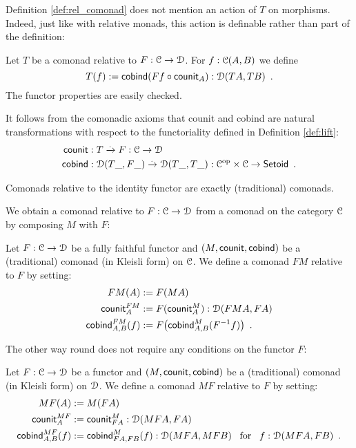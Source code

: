 \documentclass[a4paper,USenglish]{lipics}
\begin{document}
 Definition \ref{def:rel_comonad} does not mention an action of $T$ on morphisms. Indeed, just like with relative monads, this action is definable rather than part of the definition:
\begin{definition}%
\label{def:lift}
 Let $T$ be a  comonad relative to $F:\C\to\D$.
 For $f : \C(A,B)$ we define
  \[ T(f) := \cobind(\comp{\counit_A}{Ff}) : \D(TA,TB) \enspace .\] 
 The functor properties are easily checked.
\end{definition}

\begin{rem}
 It follows from the comonadic axioms that
 counit and cobind are natural transformations with respect to the functoriality defined in Definition \ref{def:lift}:
 \begin{align*}
     \counit &: T \xrightarrow{.} F : \C\to \D \\
     \cobind &: \D(T\_, F\_) \xrightarrow{.} \D(T\_, T\_) : \C^{\text{op}} \times \C \to \Setoid \enspace .
 \end{align*}

\end{rem}





Comonads relative to the identity functor are exactly (traditional) comonads.




We obtain a comonad relative to $F:\C\to\D$ from a comonad on the category $\C$ by composing $M$ with $F$:
\begin{example}\label{ex_relcom_from_com}
  Let $F : \C \to \D$ be a fully faithful functor and $(M,\counit,\cobind)$ be a (traditional) comonad (in Kleisli form) on $\C$.
  We define a comonad $FM$ relative to $F$ by setting:
   \begin{align*}
        FM(A) &:= F(MA) \\
        \counit^{FM}_A &:= F(\counit^M_A) : \D(FMA,FA) \\
        \cobind^{FM}_{A,B} (f) &:= F\bigl(\cobind^M_{A,B}(F^{-1}f)\bigr) \enspace .
    \end{align*}

\end{example}

\noindent
The other way round does not require any conditions on the functor $F$:
\begin{example}\label{ex_relcom_from_com_on_target}
    Let $F : \C \to \D$ be a functor and $(M,\counit,\cobind)$ be a (traditional) comonad (in Kleisli form) on $\D$.
  We define a comonad $MF$ relative to $F$ by setting:
  \begin{align*}
      MF(A) &:= M(FA)\\
      \counit^{MF}_A &:= \counit^M_{FA} : \D(MFA,FA) \\
      \cobind^{MF}_{A,B} (f) &:= \cobind^M_{FA,FB}(f) : \D(MFA,MFB) \enspace \text{ for } \enspace f : \D(MFA,FB) \enspace .
  \end{align*}
\end{example}
\end{document}
